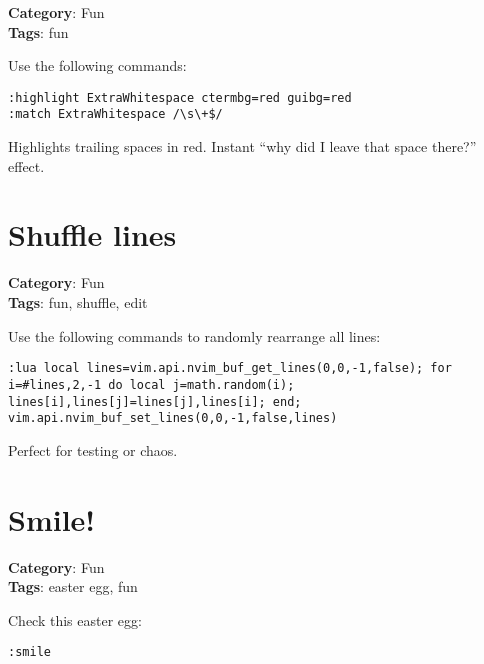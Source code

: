 {{{{{{\textbf{Category}: Fun\\ \textbf{Tags}: fun
\vspace{0.5cm}

Use the following commands:

\begin{Exa*}{}
\begin{Verbatim}[fontsize=\footnotesize, breaklines, breakanywhere]
:highlight ExtraWhitespace ctermbg=red guibg=red
:match ExtraWhitespace /\s\+$/
\end{Verbatim}
\end{Exa*}

Highlights trailing spaces in red. Instant “why did I leave that space there?” effect.

\section{Shuffle lines}

\textbf{Category}: Fun\\ \textbf{Tags}: fun, shuffle, edit
\vspace{0.5cm}

Use the following commands to randomly rearrange all lines:

\begin{Exa*}{}
\begin{Verbatim}[fontsize=\footnotesize, breaklines, breakanywhere]
:lua local lines=vim.api.nvim_buf_get_lines(0,0,-1,false); for i=#lines,2,-1 do local j=math.random(i); lines[i],lines[j]=lines[j],lines[i]; end; vim.api.nvim_buf_set_lines(0,0,-1,false,lines)
\end{Verbatim}
\end{Exa*}

Perfect for testing or chaos.

\section{Smile!}

\textbf{Category}: Fun\\ \textbf{Tags}: easter egg, fun
\vspace{0.5cm}

Check this easter egg:

\begin{Exa*}{}
\begin{Verbatim}[fontsize=\footnotesize, breaklines, breakanywhere]
:smile
\end{Verbatim}
\end{Exa*}

}}}}}}
